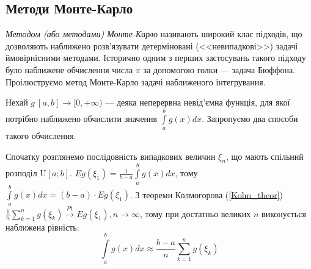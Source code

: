 \subsection{Методи Монте-Карло}
\emph{Методом (або методами) Монте-Карло} називають широкий клас підходів, що дозволяють наближено розв'язувати детерміновані (<<невипадкові>>) задачі ймовірнісними методами. 
Історично одним з перших застосувань такого підходу було наближене обчислення числа $\pi$ за допомогою голки --- задача Бюффона. Проілюструємо метод Монте-Карло задачі наближеного інтегрування.

Нехай $g\:[a,b]\to[0,+\infty)$ --- деяка неперервна невід'ємна функція, для якої потрібно наближено обчислити значення $\int\limits_a^b g(x) dx$. Запропуємо два способи такого обчислення.

Спочатку розглянемо послідовність випадкових величин $\xi_n$, що мають спільний розподіл $\mathrm{U}[a; b]$.
$Eg(\xi_1) = \frac{1}{b-a} \int\limits_a^b g(x) dx$, тому $\int\limits_a^b g(x) dx = (b-a)\cdot E g(\xi_1)$. З теореми Колмогорова (\ref{Kolm_theor})
$\frac{1}{n}\sum\limits_{k=1}^n g(\xi_k) \overset{P1}{\longrightarrow} Eg(\xi_1), n\to\infty$, тому при достатньо великих $n$ виконується наближена рівність:
$$\int\limits_a^b g(x) dx\approx\frac{b-a}{n}\sum\limits_{k=1}^ng(\xi_k)$$

